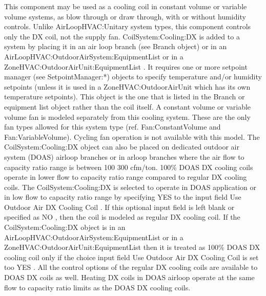 This component may be used as a cooling coil in constant volume or variable volume systems, as blow through or draw through, with or without humidity controls. Unlike AirLoopHVAC:Unitary system types, this component controls only the DX coil, not the supply fan. CoilSystem:Cooling:DX is added to a system by placing it in an air loop branch (see Branch object) or in an AirLoopHVAC:OutdoorAirSystem:EquipmentList or in a ZoneHVAC:OutdoorAirUnit:EquipmentList . It requires one or more setpoint manager (see SetpointManager:*) objects to specify temperature and/or humidity setpoints (unless it is used in a ZoneHVAC:OutdoorAirUnit which has its own temperature setpoints). This object is the one that is listed in the Branch or equipment list object rather than the coil itself. A constant volume or variable volume fan is modeled separately from this cooling system. These are the only fan types allowed for this system type (ref. Fan:ConstantVolume and Fan:VariableVolume). Cycling fan operation is not available with this model. The CoilSystem:Cooling:DX object can also be placed on dedicated outdoor air system (DOAS) airloop branches or in arloop branches where the air flow to capacity ratio range is between 100 300 cfm/ton. 100\% DOAS DX cooling coils operate in lower flow to capacity ratio range compared to regular DX cooling coils. The CoilSystem:Cooling:DX is selected to operate in DOAS application or in low flow to capacity ratio range by specifying YES to the input field Use Outdoor Air DX Cooling Coil . If this optional input field is left blank or specified as NO , then the coil is modeled as regular DX cooling coil. If the CoilSystem:Cooling:DX object is in an AirLoopHVAC:OutdoorAirSystem:EquipmentList or in a ZoneHVAC:OutdoorAirUnit:EquipmentList then it is treated as 100\% DOAS DX cooling coil only if the choice input field Use Outdoor Air DX Cooling Coil is set too YES . All the control options of the regular DX cooling coils are available to DOAS DX coils as well. Heating DX coils in DOAS airloop operate at the same flow to capacity ratio limits as the DOAS DX cooling coils.

